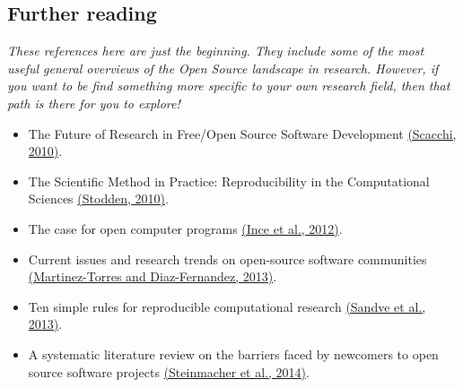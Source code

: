 \documentclass[]{book}
\begin{document}
\hypertarget{further-reading-1}{%
\subsection{Further reading }\label{further-reading-1}}

\emph{These references here are just the beginning. They include some of the most useful general overviews of the Open Source landscape in research. However, if you want to be find something more specific to your own research field, then that path is there for you to explore!}

\begin{itemize}
\item
  The Future of Research in Free/Open Source Software Development \href{https://github.com/OpenScienceMOOC/Module-5-Open-Research-Software-and-Open-Source/blob/master/Reading\%20Material_Open\%20Source\%20and\%20Open\%20Research\%20Software/Scacchi\%2C\%202010.pdf}{(Scacchi, 2010)}.
\item
  The Scientific Method in Practice: Reproducibility in the Computational Sciences \href{https://github.com/OpenScienceMOOC/Module-5-Open-Research-Software-and-Open-Source/blob/master/Reading\%20Material_Open\%20Source\%20and\%20Open\%20Research\%20Software/Stodden\%2C\%202010.pdf}{(Stodden, 2010)}.
\item
  The case for open computer programs \href{https://github.com/OpenScienceMOOC/Module-5-Open-Research-Software-and-Open-Source/blob/master/Reading\%20Material_Open\%20Source\%20and\%20Open\%20Research\%20Software/Ince\%20et\%20al.\%2C\%202012.pdf}{(Ince et al., 2012)}.
\item
  Current issues and research trends on open-source software communities \href{https://github.com/OpenScienceMOOC/Module-5-Open-Research-Software-and-Open-Source/blob/master/Reading\%20Material_Open\%20Source\%20and\%20Open\%20Research\%20Software/Martinez-Torres\%20and\%20Diaz-Fernandez\%2C\%202013.pdf}{(Martinez-Torres and Diaz-Fernandez, 2013)}.
\item
  Ten simple rules for reproducible computational research \href{https://github.com/OpenScienceMOOC/Module-5-Open-Research-Software-and-Open-Source/blob/master/Reading\%20Material_Open\%20Source\%20and\%20Open\%20Research\%20Software/Sandve\%20et\%20al.\%2C\%202013.PDF}{(Sandve et al., 2013)}.
\item
  A systematic literature review on the barriers faced by newcomers to open source software projects \href{https://github.com/OpenScienceMOOC/Module-5-Open-Research-Software-and-Open-Source/blob/master/Reading\%20Material_Open\%20Source\%20and\%20Open\%20Research\%20Software/Steinmacher\%20et\%20al.\%2C\%202014.pdf}{(Steinmacher et al., 2014)}.

\end{itemize}
\end{document}
